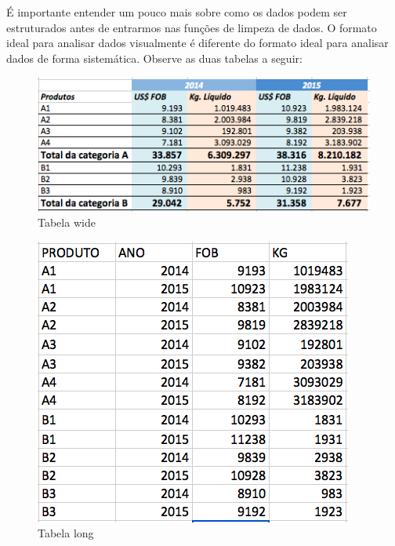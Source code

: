 \documentclass[]{book}
\begin{document}
É importante entender um pouco mais sobre como os dados podem ser
estruturados antes de entrarmos nas funções de limpeza de dados. O
formato ideal para analisar dados visualmente é diferente do formato
ideal para analisar dados de forma sistemática. Observe as duas tabelas
a seguir:

\begin{figure}

{\centering \includegraphics[width=1\linewidth]{imagens/dados_wide} 

}

\caption{Tabela wide}\label{fig:unnamed-chunk-68}
\end{figure}

\begin{figure}

{\centering \includegraphics[width=1\linewidth]{imagens/dados_long} 

}

\caption{Tabela long}\label{fig:unnamed-chunk-69}
\end{figure}
\end{document}
